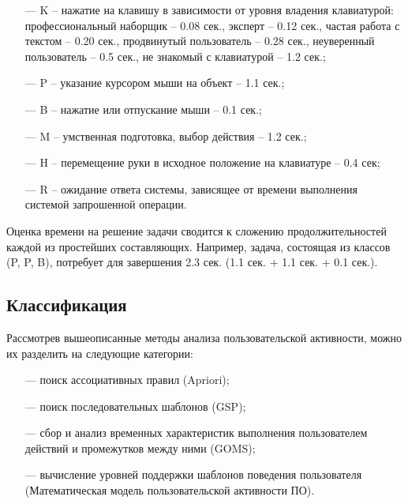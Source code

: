 \begin{itemize}
	\item[---] K – нажатие на клавишу в зависимости от уровня владения клавиатурой: профессиональный	наборщик – 0.08 сек., эксперт – 0.12 сек., частая работа с текстом – 0.20 сек., продвинутый пользователь – 0.28 сек., неуверенный пользователь – 0.5 сек., не знакомый с клавиатурой – 1.2 сек.;
	\item[---] P – указание курсором мыши на объект – 1.1 сек.;
	\item[---] B – нажатие или отпускание мыши – 0.1 сек.;
	\item[---] M – умственная подготовка, выбор действия – 1.2 сек.;
	\item[---] H – перемещение руки в исходное положение на клавиатуре – 0.4 сек;
	\item[---] R – ожидание ответа системы, зависящее от	времени выполнения системой запрошенной операции.
\end{itemize}

Оценка времени на решение задачи сводится к сложению продолжительностей каждой из простейших составляющих. Например, задача, состоящая из классов (P, P, B), потребует для завершения 2.3 сек. (1.1 сек. + 1.1 сек. + 0.1 сек.).

\subsection{Классификация} %
Рассмотрев вышеописанные методы анализа пользовательской активности, можно их разделить на следующие категории:
\begin{itemize}
	\item[---] поиск ассоциативных правил (Apriori);
	\item[---] поиск последовательных шаблонов (GSP);
	\item[---] сбор и анализ временных характеристик выполнения пользователем действий и промежутков между ними (GOMS);
	\item[---] вычисление уровней поддержки шаблонов поведения пользователя (Математическая модель пользовательской активности ПО).
\end{itemize}



